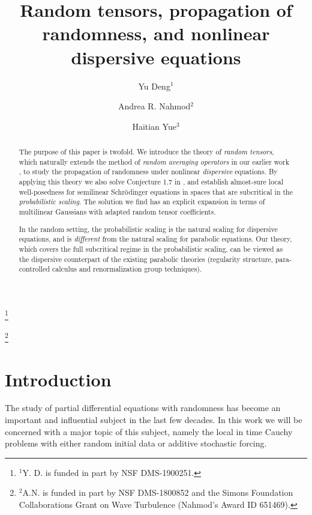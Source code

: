\documentclass[11 pt,reqno]{amsart}
\theoremstyle{definition}
\theoremstyle{remark}
\numberwithin{equation}{section}
\begin{document}
\author[Yu Deng]{Yu Deng$^1$}
\address{$^1$ Department of Mathematics, University of Southern California, Los Angeles,  CA 90089, USA }
\thanks{$^1$Y. D. is funded in part by NSF DMS-1900251.}
\author[Andrea R. Nahmod]{Andrea R. Nahmod$^2$}
\address{$^2$ 
Department of Mathematics,  University of Massachusetts,  Amherst MA 01003}
\thanks{$^2$A.N. is funded in part by NSF DMS-1800852 and the Simons Foundation Collaborations Grant on Wave Turbulence (Nahmod's Award ID 651469).}
\author[Haitian Yue]{Haitian Yue$^3$}
\address{$^3$Department of Mathematics, University of Southern California, Los Angeles,  CA 90089, USA}
  \date{}
 \title{Random tensors, propagation of randomness, and nonlinear dispersive equations}
 \begin{abstract} The purpose of this paper is twofold. We introduce the theory of \emph{random tensors}, which naturally extends the method of \emph{random averaging operators} in our earlier work \cite{DNY}, to study the propagation of randomness under nonlinear \emph{dispersive} equations. By applying this theory we also solve Conjecture 1.7 in \cite{DNY}, and establish almost-sure local well-posedness for semilinear Schr\"{o}dinger equations in spaces that are subcritical in the \emph{probabilistic scaling}. The solution we find has an explicit expansion in terms of multilinear Gaussians with adapted random tensor coefficients.
 
In the random setting, the probabilistic scaling is the natural scaling for dispersive equations, and is \emph{different} from the natural scaling for parabolic equations. Our theory, which covers the full subcritical regime in the probabilistic scaling, can be viewed as the dispersive counterpart of the existing parabolic theories (regularity structure, para-controlled calculus and renormalization group techniques).
\end{abstract}
 \maketitle
 
\tableofcontents
 \section{Introduction}\label{intro} The study of partial differential equations with randomness has become an important and influential subject in the last few decades. In this work we will be concerned with a major topic of this subject, namely the local in time Cauchy problems with either random initial data or additive stochastic forcing.
 
\end{document}
